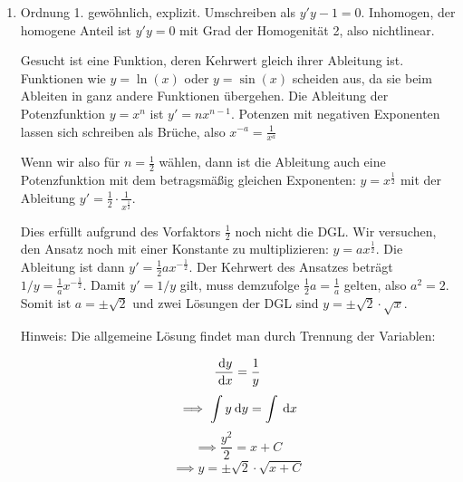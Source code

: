 \begin{enumerate}
\item Ordnung 1. gewöhnlich, explizit. Umschreiben als $y'y-1=0$. Inhomogen, der homogene Anteil ist $y'y=0$ mit Grad der Homogenität 2, also nichtlinear.

Gesucht ist eine Funktion, deren Kehrwert gleich ihrer Ableitung ist. Funktionen wie $y = \ln(x)$ oder $y = \sin(x)$ scheiden aus, da sie beim Ableiten in ganz andere Funktionen übergehen. Die Ableitung der Potenzfunktion $y=x^n$ ist $y' = n x^{n-1}$. Potenzen mit negativen Exponenten lassen sich schreiben als Brüche, also $x^{-a} = \frac{1}{x^a}$

Wenn wir also für $n=\frac{1}{2}$ wählen, dann ist die Ableitung auch eine Potenzfunktion mit dem betragsmäßig gleichen Exponenten: $y=x^{\frac{1}{2}}$ mit der Ableitung $y'=\frac{1}{2}\cdot\frac{1}{x^\frac{1}{2}}$.

Dies erfüllt aufgrund des Vorfaktors $\frac{1}{2}$ noch nicht die DGL. Wir versuchen, den Ansatz noch mit einer Konstante zu multiplizieren: $y=a x^{\frac{1}{2}}$. Die Ableitung ist dann $y'=\frac{1}{2}ax^{-\frac{1}{2}}$. Der Kehrwert des Ansatzes beträgt $1/y = \frac{1}{a} x^{-\frac{1}{2}}$. Damit $y' = 1/y$ gilt, muss demzufolge $\frac{1}{2}a = \frac{1}{a}$ gelten, also $a^2 = 2$. Somit ist $a=\pm \sqrt{2}$ und zwei Lösungen der DGL sind $y=\pm\sqrt{2}\cdot\sqrt{x}$.

Hinweis: Die allgemeine Lösung findet man durch Trennung der Variablen:

$$\frac{\:\mathrm{d}{y}}{\:\mathrm{d}{x}} = \frac{1}{y}$$
$$\implies \int y \:\mathrm{d}{y} = \int \:\mathrm{d}{x}$$
$$\implies \frac{y^2}{2} = x + C$$
$$\implies y = \pm\sqrt{2}\cdot\sqrt{x+C}$$
\end{enumerate}


